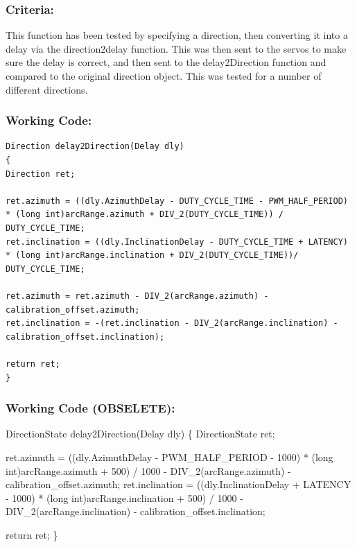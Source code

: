 \documentclass[]{report}
\begin{document}
\subsubsection{Criteria:}
This function has been tested by specifying a direction, then converting it into a delay via the direction2delay function. This was then sent to the servos to make sure the delay is correct, and then sent to the delay2Direction function and compared to the original direction object. This was tested for a number of different directions.

\subsubsection{Working Code:}
\begin{lstlisting}
Direction delay2Direction(Delay dly)
{
Direction ret;

ret.azimuth = ((dly.AzimuthDelay - DUTY_CYCLE_TIME - PWM_HALF_PERIOD) * (long int)arcRange.azimuth + DIV_2(DUTY_CYCLE_TIME)) / DUTY_CYCLE_TIME;
ret.inclination = ((dly.InclinationDelay - DUTY_CYCLE_TIME + LATENCY) * (long int)arcRange.inclination + DIV_2(DUTY_CYCLE_TIME))/ DUTY_CYCLE_TIME;

ret.azimuth = ret.azimuth - DIV_2(arcRange.azimuth) - calibration_offset.azimuth;
ret.inclination = -(ret.inclination - DIV_2(arcRange.inclination) - calibration_offset.inclination);

return ret;
}
\end{lstlisting}

\subsubsection{Working Code (OBSELETE):}
DirectionState delay2Direction(Delay dly) \newline
\{ \newline
	DirectionState ret; \newline
	
	ret.azimuth = ((dly.AzimuthDelay - PWM\_HALF\_PERIOD - 1000) * (long int)arcRange.azimuth + 500) / 1000 - DIV\_2(arcRange.azimuth) - calibration\_offset.azimuth; \newline
	ret.inclination = ((dly.InclinationDelay + LATENCY - 1000) * (long int)arcRange.inclination + 500) / 1000 - DIV\_2(arcRange.inclination) - calibration\_offset.inclination; \newline
	
	return ret; \newline
\} \newline
\end{document}
